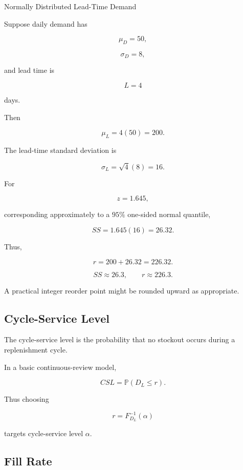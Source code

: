 \begin{workedexamplebox}{Normally Distributed Lead-Time Demand}

Suppose daily demand has

\[
\mu_D=50,
\]

\[
\sigma_D=8,
\]

and lead time is

\[
L=4
\]

days.

Then

\[
\mu_L
=
4(50)
=
200.
\]

The lead-time standard deviation is

\[
\sigma_L
=
\sqrt{4}(8)
=
16.
\]

For

\[
z=1.645,
\]

corresponding approximately to a \(95\%\) one-sided normal quantile,

\[
SS
=
1.645(16)
=
26.32.
\]

Thus,

\[
r
=
200+26.32
=
226.32.
\]

\begin{answerbox}
\[
\boxed{
SS\approx26.3,
\qquad
r\approx226.3.
}
\]
\end{answerbox}

A practical integer reorder point might be rounded upward as appropriate.

\end{workedexamplebox}

\subsection{Cycle-Service Level}
\label{subsec:cycle-service-level}

The cycle-service level is the probability that no stockout occurs during
a replenishment cycle.

In a basic continuous-review model,

\[
\boxed{
CSL
=
\mathbb{P}
(
D_L\leq r
).
}
\]

Thus choosing

\[
r
=
F_{D_L}^{-1}(\alpha)
\]

targets cycle-service level \(\alpha\).

\subsection{Fill Rate}
\label{subsec:fill-rate}

